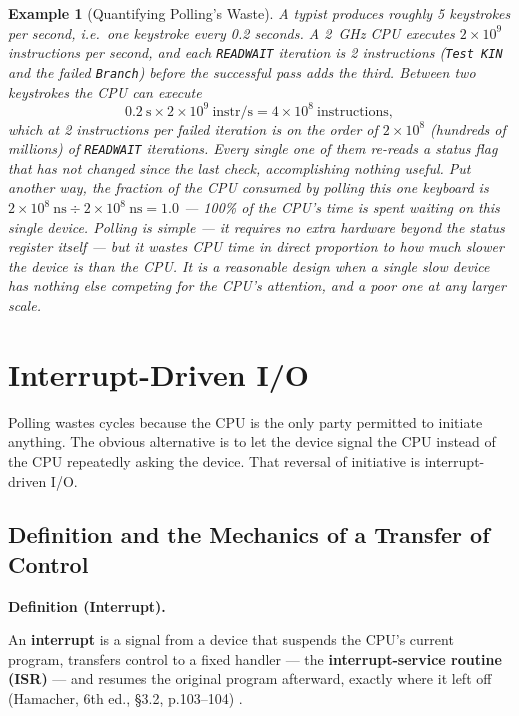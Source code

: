 \documentclass[11pt]{article}
\newtheorem{example}{Example}[section]
\newenvironment{definitionbox}[1]{%
  \par\noindent\textbf{Definition (#1).}\ \itshape
}{\par\vspace{0.3em}}
\begin{document}
\begin{example}[Quantifying Polling's Waste]
\label{ex:polling-waste}
A typist produces roughly 5 keystrokes per second, i.e.\ one keystroke every 0.2 seconds. A 2~GHz CPU executes $2\times10^9$ instructions per second, and each \texttt{READWAIT} iteration is 2 instructions (\texttt{Test KIN} and the failed \texttt{Branch}) before the successful pass adds the third. Between two keystrokes the CPU can execute
\[
0.2~\text{s} \times 2\times10^9~\text{instr/s} = 4\times10^8~\text{instructions},
\]
which at 2 instructions per failed iteration is on the order of $2\times10^8$ (hundreds of millions) of \texttt{READWAIT} iterations. Every single one of them re-reads a status flag that has not changed since the last check, accomplishing \emph{nothing} useful. Put another way, the fraction of the CPU consumed by polling this one keyboard is $2\times10^8~\text{ns} \div 2\times10^8~\text{ns} = 1.0$ --- \emph{100\%} of the CPU's time is spent waiting on this single device. Polling is simple --- it requires no extra hardware beyond the status register itself --- but it wastes CPU time in direct proportion to how much slower the device is than the CPU. It is a reasonable design when a single slow device has nothing else competing for the CPU's attention, and a poor one at any larger scale.
\end{example}

\section{Interrupt-Driven I/O}
\label{sec:interrupts}

Polling wastes cycles because the CPU is the only party permitted to initiate anything. The obvious alternative is to let the device signal the CPU instead of the CPU repeatedly asking the device. That reversal of initiative is interrupt-driven I/O.

\subsection{Definition and the Mechanics of a Transfer of Control}

\begin{definitionbox}{Interrupt}
An \textbf{interrupt} is a signal from a device that suspends the CPU's current program, transfers control to a fixed handler --- the \textbf{interrupt-service routine (ISR)} --- and resumes the original program afterward, exactly where it left off (Hamacher, 6th ed., \S3.2, p.103--104) \cite{Hamacher2002_computer_organization}.
\end{definitionbox}
\end{document}
